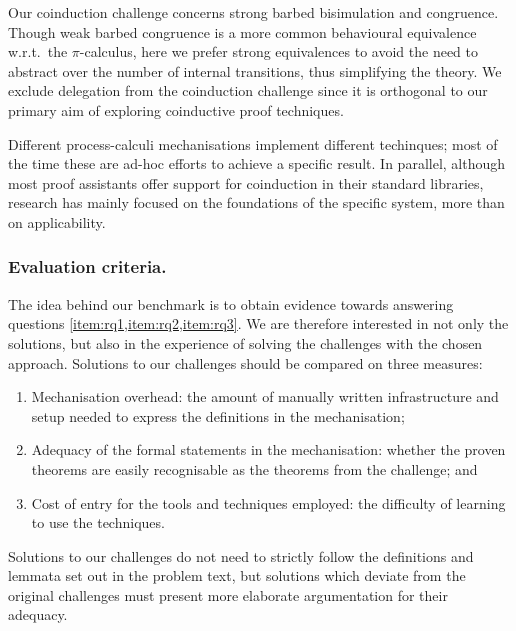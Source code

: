 \documentclass[runningheads]{llncs}
\begin{document}
Our coinduction challenge concerns strong barbed bisimulation and
congruence.
Though weak barbed congruence is a more common behavioural equivalence
w.r.t.\ the \(\pi\)-calculus, here we prefer strong equivalences to avoid the
need to abstract over the number of internal transitions, thus
simplifying the theory.  We exclude delegation from the coinduction
challenge since it is orthogonal to our primary aim of exploring
coinductive proof techniques.

Different process-calculi
mechanisations
implement different techinques;
most of the time these 
are ad-hoc efforts to achieve a specific result.
In parallel, although most proof assistants
offer support for coinduction in their standard libraries,
research has mainly focused on the foundations
of the specific system, more than on
applicability.

\subsubsection{Evaluation criteria.}
The idea behind our benchmark is to obtain evidence towards answering questions \cref{item:rq1,item:rq2,item:rq3}. We are therefore interested in not only the solutions, but also in the experience of solving the challenges with the chosen approach.
Solutions to our challenges should be compared on three measures:
\begin{enumerate}
\item Mechanisation overhead: the amount of manually written infrastructure and setup needed to express the definitions in the mechanisation;
\item Adequacy of the formal statements in the mechanisation: whether the proven theorems are easily recognisable as the theorems from the challenge; and
\item Cost of entry for the tools and techniques employed: the difficulty of learning to use the techniques.
\end{enumerate}
Solutions to our challenges do not need to strictly follow the definitions and lemmata set out in the problem text, but solutions which deviate from the original challenges must present more elaborate argumentation for their adequacy.


\end{document}
